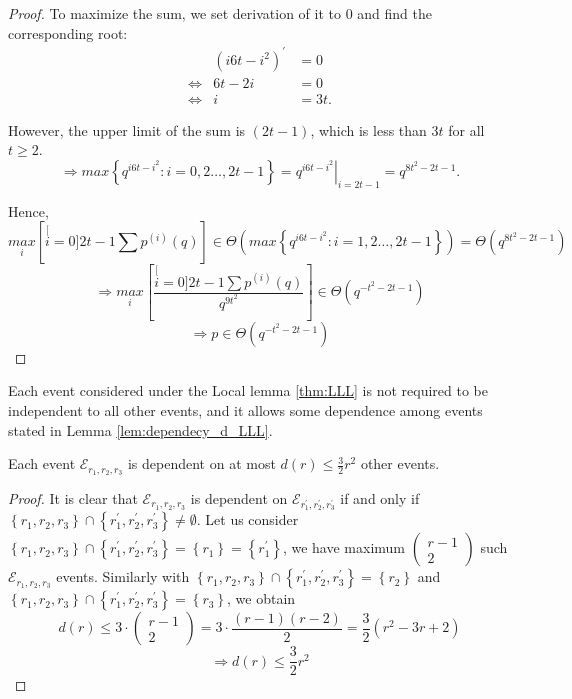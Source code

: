 \begin{proof}
To maximize the sum, we set derivation of it to 0 and find the corresponding
root: 
\begin{eqnarray*}
 & \left(i6t-i^{2}\right)^{'} & =0\\
\Leftrightarrow & 6t-2i & =0\\
\Leftrightarrow & i & =3t.
\end{eqnarray*}

However, the upper limit of the sum is $\left(2t-1\right)$, which
is less than $3t$ for all $t\geq2$.
\[
\Rightarrow max\left\{ q^{i6t-i^{2}}:i=0,2\ldots,2t-1\right\} =\left.q^{i6t-i^{2}}\right|_{i=2t-1}=q^{8t^{2}-2t-1}.
\]

Hence,
\[
\underset{i}{max}\left[\stackrel[i=0]{2t-1}{\mathop{\sum}}p^{(i)}(q)\right]\in\Theta\left(max\left\{ q^{i6t-i^{2}}:i=1,2\ldots,2t-1\right\} \right)=\Theta\left(q^{8t^{2}-2t-1}\right)
\]
\[
\Rightarrow\underset{i}{max}\left[\frac{\stackrel[i=0]{2t-1}{\mathop{\sum}}p^{(i)}(q)}{q^{9t^{2}}}\right]\in\Theta\left(q^{-t^{2}-2t-1}\right)
\]
\[
\Rightarrow p\in\Theta\left(q^{-t^{2}-2t-1}\right)
\]
\end{proof}
Each event considered under the Local lemma \ref{thm:LLL} is not
required to be independent to all other events, and it allows some
dependence among events stated in Lemma \ref{lem:dependecy_d_LLL}.
\begin{lem}
Each event $\mathcal{E}_{r_{1},r_{2},r_{3}}$ is dependent on at most
$d(r)\leq\frac{3}{2}r^{2}$ other events. \label{lem:dependecy_d_LLL}
\end{lem}
\begin{proof}
It is clear that $\mathcal{E}_{r_{1},r_{2},r_{3}}$ is dependent on
$\mathcal{E}_{r_{1}^{'},r_{2}^{'},r_{3}^{'}}$ if and only if $\left\{ r_{1},r_{2},r_{3}\right\} \cap\left\{ r_{1}^{'},r_{2}^{'},r_{3}^{'}\right\} \neq\emptyset$.
Let us consider $\left\{ r_{1},r_{2},r_{3}\right\} \cap\left\{ r_{1}^{'},r_{2}^{'},r_{3}^{'}\right\} =\left\{ r_{1}\right\} =\left\{ r_{1}^{'}\right\} $,
we have maximum $\left(\begin{array}{c}
r-1\\
2
\end{array}\right)$ such $\mathcal{E}_{r_{1},r_{2},r_{3}}$ events. Similarly with $\left\{ r_{1},r_{2},r_{3}\right\} \cap\left\{ r_{1}^{'},r_{2}^{'},r_{3}^{'}\right\} =\left\{ r_{2}\right\} $
and $\left\{ r_{1},r_{2},r_{3}\right\} \cap\left\{ r_{1}^{'},r_{2}^{'},r_{3}^{'}\right\} =\left\{ r_{3}\right\} $,
we obtain
\[
d(r)\leq3\cdot\left(\begin{array}{c}
r-1\\
2
\end{array}\right)=3\cdot\frac{\left(r-1\right)\left(r-2\right)}{2}=\frac{3}{2}\left(r^{2}-3r+2\right)
\]
\[
\Rightarrow d(r)\leq\frac{3}{2}r^{2}
\]
\end{proof}

